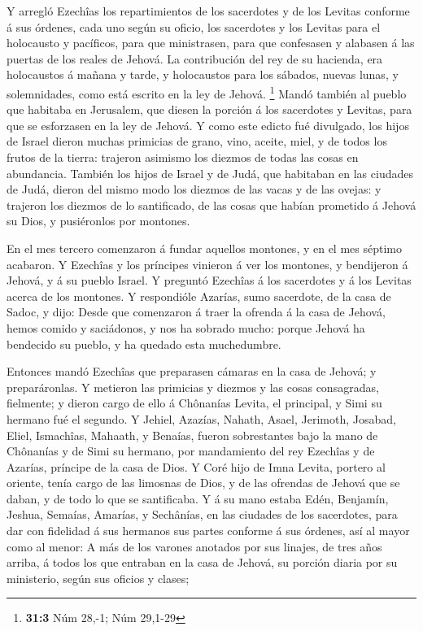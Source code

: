  Y arregló Ezechîas los repartimientos de los sacerdotes y
de los Levitas conforme á sus órdenes, cada uno según su oficio, los
sacerdotes y los Levitas para el holocausto y pacíficos, para que
ministrasen, para que confesasen y alabasen á las puertas de los reales
de Jehová.  La contribución del rey de su hacienda, era
holocaustos á mañana y tarde, y holocaustos para los sábados, nuevas
lunas, y solemnidades, como está escrito en la ley de Jehová.
\footnote{\textbf{31:3} Núm 28,-1; Núm 29,1-29}  Mandó
también al pueblo que habitaba en Jerusalem, que diesen la porción á los
sacerdotes y Levitas, para que se esforzasen en la ley de Jehová.
 Y como este edicto fué divulgado, los hijos de Israel
dieron muchas primicias de grano, vino, aceite, miel, y de todos los
frutos de la tierra: trajeron asimismo los diezmos de todas las cosas en
abundancia.  También los hijos de Israel y de Judá, que
habitaban en las ciudades de Judá, dieron del mismo modo los diezmos de
las vacas y de las ovejas: y trajeron los diezmos de lo santificado, de
las cosas que habían prometido á Jehová su Dios, y pusiéronlos por
montones.

 En el mes tercero comenzaron á fundar aquellos montones, y
en el mes séptimo acabaron.  Y Ezechîas y los príncipes
vinieron á ver los montones, y bendijeron á Jehová, y á su pueblo
Israel.  Y preguntó Ezechîas á los sacerdotes y á los
Levitas acerca de los montones.  Y respondióle Azarías,
sumo sacerdote, de la casa de Sadoc, y dijo: Desde que comenzaron á
traer la ofrenda á la casa de Jehová, hemos comido y saciádonos, y nos
ha sobrado mucho: porque Jehová ha bendecido su pueblo, y ha quedado
esta muchedumbre.

 Entonces mandó Ezechîas que preparasen cámaras en la casa
de Jehová; y preparáronlas.  Y metieron las primicias y
diezmos y las cosas consagradas, fielmente; y dieron cargo de ello á
Chônanías Levita, el principal, y Simi su hermano fué el segundo.
 Y Jehiel, Azazías, Nahath, Asael, Jerimoth, Josabad,
Eliel, Ismachîas, Mahaath, y Benaías, fueron sobrestantes bajo la mano
de Chônanías y de Simi su hermano, por mandamiento del rey Ezechîas y de
Azarías, príncipe de la casa de Dios.  Y Coré hijo de Imna
Levita, portero al oriente, tenía cargo de las limosnas de Dios, y de
las ofrendas de Jehová que se daban, y de todo lo que se santificaba.
 Y á su mano estaba Edén, Benjamín, Jeshua, Semaías,
Amarías, y Sechânías, en las ciudades de los sacerdotes, para dar con
fidelidad á sus hermanos sus partes conforme á sus órdenes, así al mayor
como al menor:  A más de los varones anotados por sus
linajes, de tres años arriba, á todos los que entraban en la casa de
Jehová, su porción diaria por su ministerio, según sus oficios y clases;

